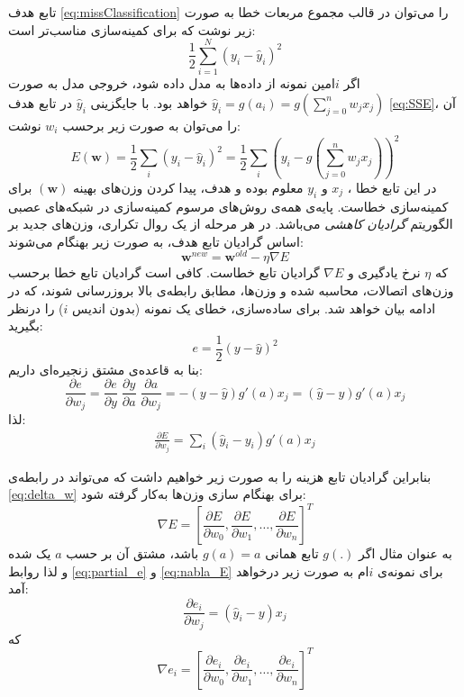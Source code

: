 \documentclass[11pt, twoside]{imsproc}
\let\LTRfootnote\footnoteA
\begin{document}
تابع هدف
\eqref{eq:missClassification}
را می‌توان در قالب مجموع مربعات خطا به صورت زیر نوشت که برای کمینه‌سازی مناسب‌تر است:
\begin{equation}
\frac{1}{2}\sum_{i=1}^N(y_i-\hat{y}_i)^2
\label{eq:SSE}
\end{equation}
اگر  $i$امین نمونه از داده‌ها به مدل داده شود، خروجی مدل به صورت
$\hat{y}_i = g(a_i) = g(\sum_{j=0}^n w_j x_j)$
خواهد بود. با جایگزینی
$\hat{y}_i$
در  تابع هدف
\eqref{eq:SSE}،
آن را می‌توان به صورت زیر برحسب
$w_i$
نوشت:
\begin{equation}
E(\mathbf{w}) = \frac{1}{2}\sum_{i}(y_i-\hat{y}_i)^2 = \frac{1}{2}\sum_{i}\left(y_i-g(\sum_{j=0}^n w_j x_j)\right)^2
\label{eq:cost_w}
\end{equation}
در این تابع خطا%
\LTRfootnote{Error Function}،‌
$x_j$
و
$y_i$
معلوم بوده و هدف، پیدا کردن وزن‌های بهینه
$(\mathbf{w})$
برای کمینه‌سازی خطاست.
پایه‌ی همه‌ی روش‌های مرسوم کمینه‌سازی در شبکه‌های عصبی الگوریتم
\textit{گرادیان کاهشی}
می‌باشد. در هر مرحله از یک روال تکراری، وزن‌های جدید بر اساس گرادیان تابع هدف، به صورت زیر بهنگام می‌شوند:
\begin{equation}
\mathbf{w}^{new} = \mathbf{w}^{old} - \eta\nabla E
\label{eq:delta_w}
\end{equation}
که
$\eta$
نرخ یادگیری و
$\nabla E$
گرادیان تابع خطاست. کافی است گرادیان تابع خطا برحسب وزن‌های اتصالات، محاسبه شده و وزن‌ها، مطابق رابطه‌ی بالا بروزرسانی شوند، که در ادامه بیان خواهد شد.
برای ساده‌سازی، خطای یک نمونه (بدون اندیس $i$)‌ را  درنظر بگیرید:
$$e =\frac{1}{2}(y-\hat{y})^2 $$
بنا به قاعده‌ی مشتق زنجیره‌ای داریم:
\begin{equation}\label{eq:partial_e}
      \frac{\partial e}{\partial w_{j}}
      =\frac{\partial e}{\partial y}\;
      \frac{\partial y}{\partial a}\;
      \frac{\partial a}{\partial w_{j}}
      =-(y-\hat{y})g'(a)x_j=(\hat{y}-y)g'(a)x_j
 \end{equation}
 لذا:
 \begin{align}\label{eq:partial_E}
\frac{\partial E}{\partial w_j} = \sum_i (\hat{y}_i-y_i)g'(a)x_j
\end{align}

بنابراین گرادیان تابع هزینه را به صورت زیر خواهیم داشت که می‌تواند در رابطه‌ی
\eqref{eq:delta_w}
برای بهنگام سازی وزن‌ها به‌کار گرفته شود:
\begin{equation}\label{eq:nabla_E}
\nabla E = \left[\frac{\partial E}{\partial w_0},\frac{\partial E}{\partial w_1},\dots,\frac{\partial E}{\partial w_n}\right]^T
\end{equation}
به عنوان مثال اگر 
$g(.)$
تابع همانی
$g(a)=a$
  باشد، مشتق آن بر حسب
  $a$
  یک شده و لذا روابط
  \eqref{eq:partial_e} 
  و
  \eqref{eq:nabla_E}   
برای نمونه‌ی $i$ام  به صورت زیر درخواهد آمد:
  \begin{equation}\label{eq:partial_e_gaa}
\frac{\partial e_i}{\partial w_{j}}
      =(\hat{y}_i-y)x_j
 \end{equation}
 که 
   \begin{equation}\label{eq:nabla_e_gaa}
\nabla e_i = \left[\frac{\partial e_i}{\partial w_0},\frac{\partial e_i}{\partial w_1},\dots,\frac{\partial e_i}{\partial w_n}\right]^T
 \end{equation}
\end{document}
